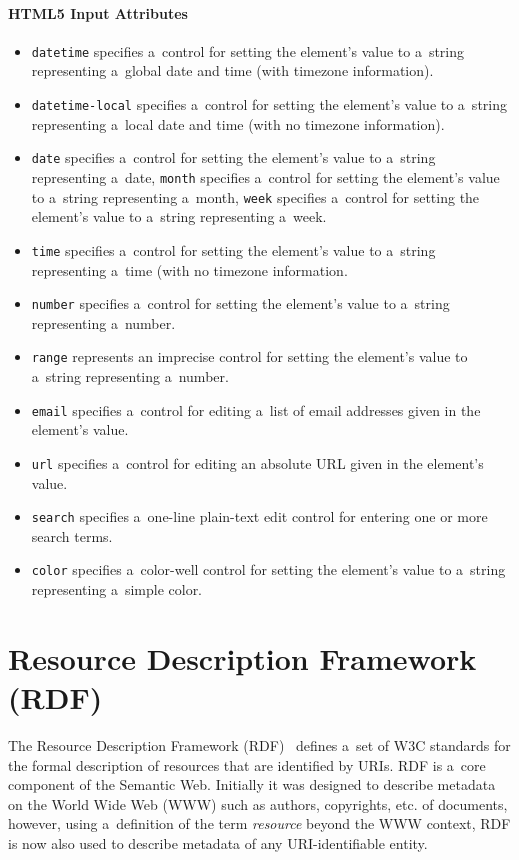 \paragraph{HTML5 Input Attributes}
\begin{itemize}
\item \texttt{datetime} specifies a~control for setting the element’s value
to a~string representing a~global date and time (with timezone information).
\item \texttt{datetime-local} specifies a~control for setting the element’s value
to a~string representing a~local date and time (with no timezone information).
\item \texttt{date} specifies a~control for setting the element’s value
to a~string representing a~date, \texttt{month} specifies a~control
for setting the element’s value to a~string
representing a~month, \texttt{week} specifies a~control for setting the element’s value
to a~string representing a~week.
\item \texttt{time} specifies a~control for setting the element’s value
to a~string representing a~time (with no timezone information.
\item \texttt{number} specifies a~control for setting the element’s value
to a~string representing a~number.
\item \texttt{range}  represents an imprecise control for setting the element’s value
to a~string representing a~number.
\item \texttt{email} specifies a~control for editing a~list of email addresses
given in the element’s value.
\item \texttt{url} specifies a~control for editing an absolute URL
given in the element’s value.
\item \texttt{search} specifies a~one-line plain-text edit control
for entering one or more search terms.
\item \texttt{color} specifies a~color-well control for setting the element’s value
to a~string representing a~simple color.
\end{itemize}

\section{Resource Description Framework (RDF)} \label{sec:rdf}
The Resource Description Framework (RDF)~\cite{Klyne2004} defines
a~set of W3C standards for the formal description of resources that are identified by URIs.
RDF is a~core component of the Semantic Web.
Initially it was designed to describe metadata on the World Wide Web (WWW) such as authors,
copyrights, etc. of documents, however, using a~definition of the term \emph{resource}
beyond the WWW context, RDF is now also used to describe metadata of any URI-identifiable entity.

